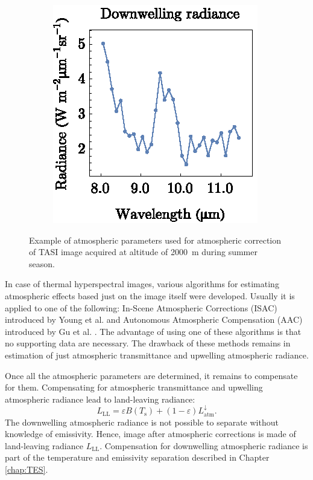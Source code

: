 \begin{figure}[htb]
	\hspace{1em}
	\begin{subfigure}[t]{.3\linewidth}
		\centering
		\includegraphics[scale=1]{pics/Chapter_02/Downwelling.eps}
		\vspace{-0.4cm}
		\caption{}
	\end{subfigure}
	\vspace{1.5 em}
	\caption{Example of atmospheric parameters used for atmospheric correction of TASI image acquired at altitude of \SI{2000}{\meter} during summer season.}
	\label{fig:AtmParams}
\end{figure}

In case of thermal hyperspectral images, various algorithms for estimating atmospheric effects based just on the image itself were developed. Usually it is applied to one of the following: In-Scene Atmospheric Corrections (ISAC) introduced by Young et al. \cite{Y02} and Autonomous Atmospheric Compensation (AAC) introduced by Gu et al. \cite{GG00}. The advantage of using one of these algorithms is that no supporting data are necessary. The drawback of these methods remains in estimation of just atmospheric transmittance and upwelling atmospheric radiance.

Once all the atmospheric parameters are determined, it remains to compensate for them. Compensating for atmospheric transmittance and upwelling atmospheric radiance lead to land-leaving radiance:
\begin{equation}
\label{eq:landleavingRadiance}
L_\mathrm{LL} = \varepsilon B(T_\mathrm{s}) + (1 - \varepsilon) L^\downarrow_\mathrm{atm}.
\end{equation}
The downwelling atmospheric radiance is not possible to separate without knowledge of emissivity. Hence, image after atmospheric corrections is made of land-leaving radiance $L_\mathrm{LL}$. Compensation for downwelling atmospheric radiance is part of the temperature and emissivity separation described in Chapter \ref{chap:TES}.

